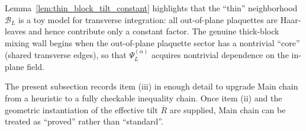 \begin{remark}
Lemma~\ref{lem:thin_block_tilt_constant} highlights that the ``thin'' neighborhood $\mathcal B_L$ is a toy model for transverse integration:
all out-of-plane plaquettes are Haar-leaves and hence contribute only a constant factor.
The genuine thick-block mixing wall begins when the out-of-plane plaquette sector has a nontrivial ``core'' (shared transverse edges),
so that $\Psi_L^{(\alpha)}$ acquires nontrivial dependence on the in-plane field.
\end{remark}


\medskip
\noindent
The present subsection records item (iii) in enough detail to upgrade Main chain from a heuristic to a fully checkable inequality chain.
Once item (ii) and the geometric instantiation of the effective tilt $\overline R$ are supplied, Main chain can be treated as ``proved'' rather than ``standard''.


